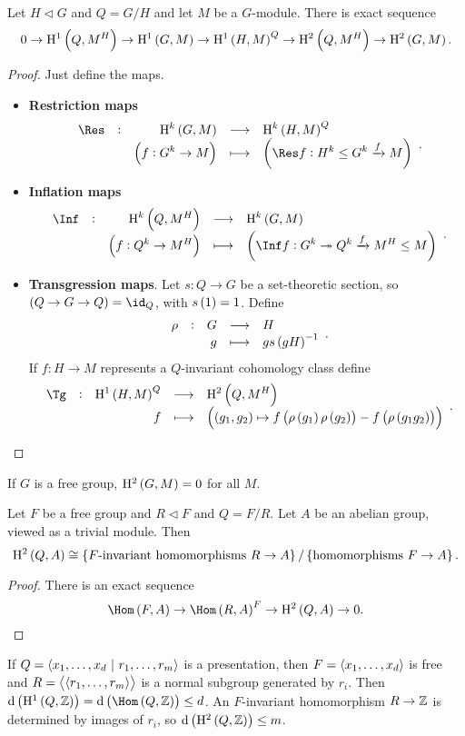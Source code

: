 \begin{theorem}
Let $ H \triangleleft G $ and $ Q = G / H $ and let $ M $ be a $ G $-module. There is exact sequence
$$ 0 \to \H^1\br{Q, M^H} \to \H^1\br{G, M} \to \H^1\br{H, M}^Q \to \H^2\br{Q, M^H} \to \H^2\br{G, M}. $$
\end{theorem}

\begin{proof}
Just define the maps.
\begin{itemize}
\item \textbf{Restriction maps}
$$ \function[\Res]{\H^k\br{G, M}}{\H^k\br{H, M}^Q}{\br{f : G^k \to M}}{\br{\Res f : H^k \le G^k \xrightarrow{f} M}}. $$
\item \textbf{Inflation maps}
$$ \function[\Inf]{\H^k\br{Q, M^H}}{\H^k\br{G, M}}{\br{f : Q^k \to M^H}}{\br{\Inf f : G^k \twoheadrightarrow Q^k \xrightarrow{f} M^H \le M}}. $$
\item \textbf{Transgression maps}. Let $ s : Q \to G $ be a set-theoretic section, so $ \br{Q \to G \to Q} = \id_Q $, with $ s\br{1} = 1 $. Define
$$ \function[\rho]{G}{H}{g}{gs\br{gH}^{-1}}. $$
If $ f : H \to M $ represents a $ Q $-invariant cohomology class define
$$ \function[\Tg]{\H^1\br{H, M}^Q}{\H^2\br{Q, M^H}}{f}{\br{\br{g_1, g_2} \mapsto f\br{\rho\br{g_1}\rho\br{g_2}} - f\br{\rho\br{g_1g_2}}}}. $$
\end{itemize}
\end{proof}

\pagebreak

If $ G $ is a free group, $ \H^2\br{G, M} = 0 $ for all $ M $.

\begin{corollary}
Let $ F $ be a free group and $ R \triangleleft F $ and $ Q = F / R $. Let $ A $ be an abelian group, viewed as a trivial module. Then
$$ \H^2\br{Q, A} \cong \cbr{\text{$ F $-invariant homomorphisms} \ R \to A} / \cbr{\text{homomorphisms} \ F \to A}. $$
\end{corollary}

\begin{proof}
There is an exact sequence
$$ \Hom\br{F, A} \to \Hom\br{R, A}^F \to \H^2\br{Q, A} \to 0. $$
\end{proof}

If $ Q = \left\langle x_1, \dots, x_d \ \middle| \  r_1, \dots, r_m \right\rangle $ is a presentation, then $ F = \left\langle x_1, \dots, x_d \right\rangle $ is free and $ R = \left\langle \left\langle r_1, \dots, r_m \right\rangle \right\rangle $ is a normal subgroup generated by $ r_i $. Then $ \d\br{\H^1\br{Q, \ZZ}} = \d\br{\Hom\br{Q, \ZZ}} \le d $. An $ F $-invariant homomorphism $ R \to \mathbb{Z} $ is determined by images of $ r_i $, so $ \d\br{\H^2\br{Q, \ZZ}} \le m $.

